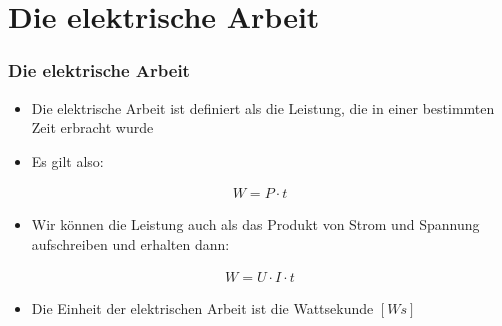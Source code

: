 
\section{Die elektrische Arbeit}

\begin{frame}
  \frametitle{Die elektrische Arbeit}
  \begin{itemize}
    \item Die elektrische Arbeit ist definiert als die Leistung, die in einer bestimmten Zeit erbracht wurde
    \item Es gilt also:
  \end{itemize}
  \begin{align}
    W = P \cdot t
  \end{align}
  \begin{itemize}
    \item Wir können die Leistung auch als das Produkt von Strom und Spannung aufschreiben und erhalten dann:
  \end{itemize}
  \begin{align}
    W = U \cdot I \cdot t
  \end{align}
  \begin{itemize}
    \item Die Einheit der elektrischen Arbeit ist die Wattsekunde $[Ws]$
  \end{itemize}
\end{frame}

